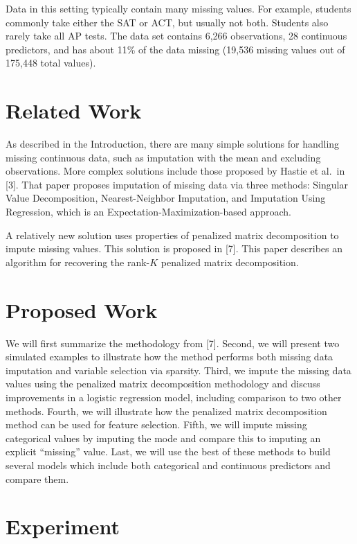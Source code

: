 \documentclass{article}
\begin{document}
Data in this setting typically contain many missing values.  For example, students commonly take either the SAT or ACT, but usually not both.  Students also rarely take all AP tests.  The data set contains 6,266 observations, 28 continuous predictors, and has about 11\% of the data missing (19,536 missing values out of 175,448 total values).

\section{Related Work}

As described in the Introduction, there are many simple solutions for handling missing continuous data, such as imputation with the mean and excluding observations.  More complex solutions include those proposed by Hastie et al.~in [3].  That paper proposes imputation of missing data via three methods: Singular Value Decomposition, Nearest-Neighbor Imputation, and Imputation Using Regression, which is an Expectation-Maximization-based approach.

A relatively new solution uses properties of penalized matrix decomposition to impute missing values.  This solution is proposed in [7].  This paper describes an algorithm for recovering the rank-$K$ penalized matrix decomposition.

\section{Proposed Work}

We will first summarize the methodology from [7].  Second, we will present two simulated examples to illustrate how the method performs both missing data imputation and variable selection via sparsity.  Third, we impute the missing data values using the penalized matrix decomposition methodology and discuss improvements in a logistic regression model, including comparison to two other methods.  Fourth, we will illustrate how the penalized matrix decomposition method can be used for feature selection.  Fifth, we will impute missing categorical values by imputing the mode and compare this to imputing an explicit ``missing'' value.  Last, we will use the best of these methods to build several models which include both categorical and continuous predictors and compare them.

\section{Experiment}
\end{document}
